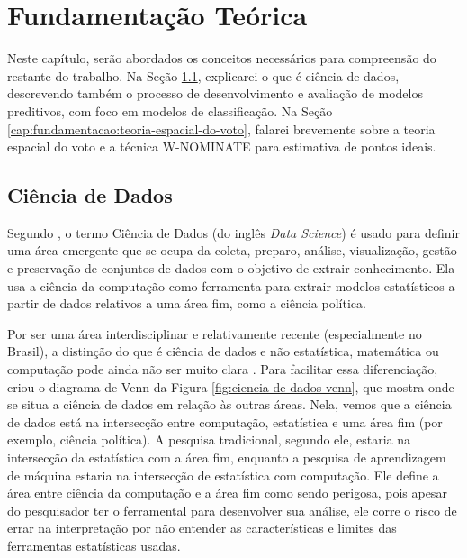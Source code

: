 \documentclass[a4paper,titlepage]{ppgi}\usepackage[]{graphicx}\usepackage[]{color}
\begin{document}
\newpage
\cleardoublepage
\Introducao


%
%






\chapter{Fundamentação Teórica}\label{cap:fundamentacao}

Neste capítulo, serão abordados os conceitos necessários para compreensão do
restante do trabalho. Na Seção \ref{cap:fundamentacao:ciencia-de-dados},
explicarei o que é ciência de dados, descrevendo também o processo de
desenvolvimento e avaliação de modelos preditivos, com foco em modelos de
classificação. Na Seção \ref{cap:fundamentacao:teoria-espacial-do-voto},
falarei brevemente sobre a teoria espacial do voto e a técnica W-NOMINATE para
estimativa de pontos ideais.

\section{Ciência de Dados}
\label{cap:fundamentacao:ciencia-de-dados}

Segundo , o termo Ciência de Dados (do inglês
\emph{Data Science}) é usado para definir uma área emergente que se ocupa da
coleta, preparo, análise, visualização, gestão e preservação de conjuntos de
dados com o objetivo de extrair conhecimento. Ela usa a ciência da computação
como ferramenta para extrair modelos estatísticos a partir de dados relativos a
uma área fim, como a ciência política.

Por ser uma área interdisciplinar e relativamente recente (especialmente no
Brasil), a distinção do que é ciência de dados e não estatística, matemática ou
computação pode ainda não ser muito clara \cite{Porto2014}. Para facilitar essa
diferenciação,  criou o diagrama de Venn da Figura
\ref{fig:ciencia-de-dados-venn}, que mostra onde se situa a ciência de dados em
relação às outras áreas. Nela, vemos que a ciência de dados está na intersecção
entre computação, estatística e uma área fim (por exemplo, ciência política). A
pesquisa tradicional, segundo ele, estaria na intersecção da estatística com a
área fim, enquanto a pesquisa de aprendizagem de máquina estaria na intersecção
de estatística com computação. Ele define a área entre ciência da computação e
a área fim como sendo perigosa, pois apesar do pesquisador ter o ferramental
para desenvolver sua análise, ele corre o risco de errar na interpretação por
não entender as características e limites das ferramentas estatísticas usadas.
\end{document}
